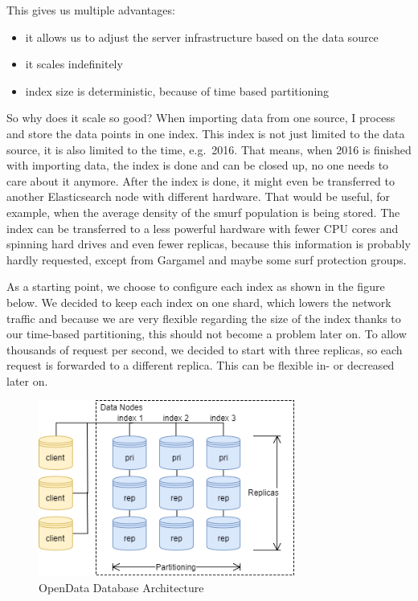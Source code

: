 This gives us multiple advantages:

\begin{itemize}
\tightlist
\item
  it allows us to adjust the server infrastructure based on the data
  source
\item
  it scales indefinitely
\item
  index size is deterministic, because of time based partitioning
\end{itemize}

So why does it scale so good? When importing data from one source, I
process and store the data points in one index. This index is not just
limited to the data source, it is also limited to the time, e.g.~2016.
That means, when 2016 is finished with importing data, the index is done
and can be closed up, no one needs to care about it anymore. After the
index is done, it might even be transferred to another Elasticsearch
node with different hardware. That would be useful, for example, when
the average density of the smurf population is being stored. The index
can be transferred to a less powerful hardware with fewer CPU cores and
spinning hard drives and even fewer replicas, because this information
is probably hardly requested, except from Gargamel and maybe some surf
protection groups.

As a starting point, we choose to configure each index as shown in the
figure below. We decided to keep each index on one shard, which lowers
the network traffic and because we are very flexible regarding the size
of the index thanks to our time-based partitioning, this should not
become a problem later on. To allow thousands of request per second, we
decided to start with three replicas, so each request is forwarded to a
different replica. This can be flexible in- or decreased later on.

\begin{figure}[htbp]
	\centering
	\includegraphics[width=0.75\textwidth]{images/07_database_architecture.png}
	\caption{OpenData Database Architecture}
	\label{fig:db-architecture}
\end{figure}

